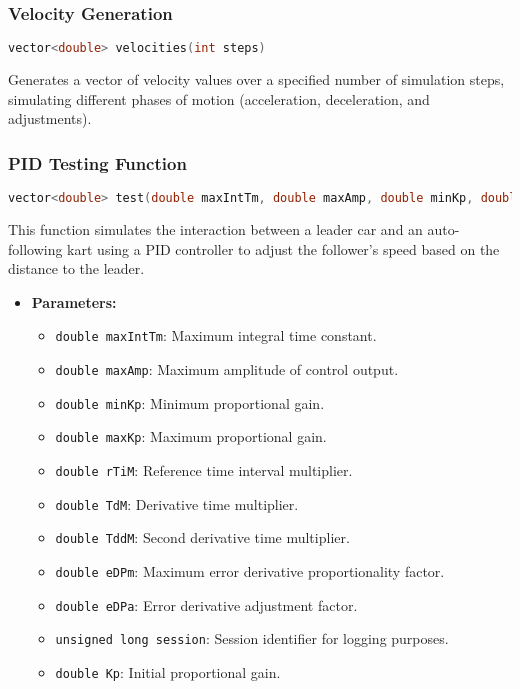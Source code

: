 \documentclass[a4paper,12pt]{article}
\begin{document}
\begin{lstlising}[language=C++]
\subsubsection{Velocity Generation}
\begin{lstlisting}[language=cpp]
vector<double> velocities(int steps)
\end{lstlisting}
Generates a vector of velocity values over a specified number of simulation steps, simulating different phases of motion (acceleration, deceleration, and adjustments).
\subsubsection{PID Testing Function}
\begin{lstlisting}[language=cpp]
vector<double> test(double maxIntTm, double maxAmp, double minKp, double maxKp, double rTiM, double TdM, double TddM, double eDPm, double eDPa, unsigned long session, double Kp, double preE = 0, unsigned long preT = 0, double timeInterval = 10, int steps = 1000)
\end{lstlisting}
This function simulates the interaction between a leader car and an auto-following kart using a PID controller to adjust the follower's speed based on the distance to the leader.
\begin{itemize}
\item \textbf{Parameters:}
\begin{itemize}
\item \texttt{double maxIntTm}: Maximum integral time constant.
\item \texttt{double maxAmp}: Maximum amplitude of control output.
\item \texttt{double minKp}: Minimum proportional gain.
\item \texttt{double maxKp}: Maximum proportional gain.
\item \texttt{double rTiM}: Reference time interval multiplier.
\item \texttt{double TdM}: Derivative time multiplier.
\item \texttt{double TddM}: Second derivative time multiplier.
\item \texttt{double eDPm}: Maximum error derivative proportionality factor.
\item \texttt{double eDPa}: Error derivative adjustment factor.
\item \texttt{unsigned long session}: Session identifier for logging purposes.
\item \texttt{double Kp}: Initial proportional gain.

\end{itemize}
\end{itemize}
\end{lstlising}
\end{document}

